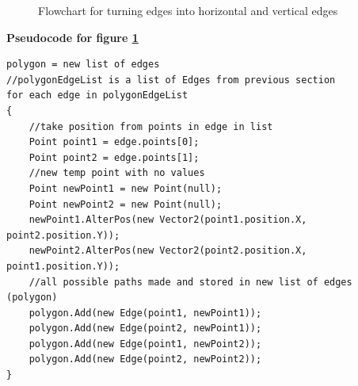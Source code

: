 \documentclass{article}
\begin{document}
\begin{figure}[p]
  \centering
  \caption{Flowchart for turning edges into horizontal and vertical edges}
  \label{fig:turn edges}
\end{figure}

\pagebreak


\textbf{Pseudocode for figure \ref{fig:turn edges}}
\begin{lstlisting}
polygon = new list of edges
//polygonEdgeList is a list of Edges from previous section
for each edge in polygonEdgeList
{
	//take position from points in edge in list
    Point point1 = edge.points[0];
    Point point2 = edge.points[1];
    //new temp point with no values
    Point newPoint1 = new Point(null);
    Point newPoint2 = new Point(null);
    newPoint1.AlterPos(new Vector2(point1.position.X, point2.position.Y));
    newPoint2.AlterPos(new Vector2(point2.position.X, point1.position.Y));
    //all possible paths made and stored in new list of edges (polygon)
    polygon.Add(new Edge(point1, newPoint1));
    polygon.Add(new Edge(point2, newPoint1));
    polygon.Add(new Edge(point1, newPoint2));
    polygon.Add(new Edge(point2, newPoint2));
}
\end{lstlisting}
\end{document}
